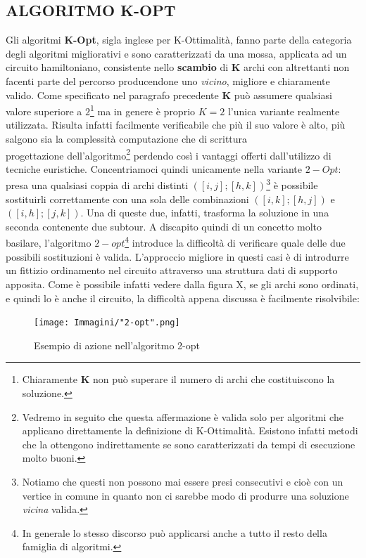 \documentclass[11pt]{article}
\begin{document}
\subsection*{ALGORITMO K-OPT}

Gli algoritmi \textbf{K-Opt}, sigla inglese per K-Ottimalità, fanno parte della categoria degli algoritmi migliorativi e sono caratterizzati da una mossa, applicata ad un circuito hamiltoniano, consistente nello \textbf{scambio} di \textbf{K} archi con altrettanti non facenti parte del percorso producendone uno \textit{vicino}, migliore e chiaramente valido.
Come specificato nel paragrafo precedente \textbf{K} può assumere qualsiasi valore superiore a $2$\footnote{Chiaramente \textbf{K} non può superare il numero di archi che costituiscono la soluzione.} ma in genere è proprio $K = 2$ l'unica variante realmente utilizzata. Risulta infatti facilmente verificabile che più il suo valore è alto, più salgono sia la complessità computazione che di scrittura\\progettazione dell'algoritmo\footnote{Vedremo in seguito che questa affermazione è valida solo per algoritmi che applicano direttamente la definizione di K-Ottimalità. Esistono infatti metodi che la ottengono indirettamente se sono caratterizzati da tempi di esecuzione molto buoni.} perdendo così i vantaggi offerti dall'utilizzo di tecniche euristiche.
Concentriamoci quindi unicamente nella variante $2-Opt$: presa una qualsiasi coppia di archi distinti $([i,j];[h,k])$\footnote{Notiamo che questi non possono mai essere presi consecutivi e cioè con un vertice in comune in quanto non ci sarebbe modo di produrre una soluzione \textit{vicina} valida.} è possibile sostituirli correttamente con una sola delle combinazioni $([i,k];[h,j])$ e $([i,h];[j,k])$. Una di queste due, infatti, trasforma la soluzione in una seconda contenente due subtour.
A discapito quindi di un concetto molto basilare, l'algoritmo $2-opt$\footnote{In generale lo stesso discorso può applicarsi anche a tutto il resto della famiglia di algoritmi.} introduce la difficoltà di verificare quale delle due possibili sostituzioni è valida. L'approccio migliore in questi casi è di introdurre un fittizio ordinamento nel circuito attraverso una struttura dati di supporto apposita. Come è possibile infatti vedere dalla figura X, se gli archi sono ordinati, e quindi lo è anche il circuito, la difficoltà appena discussa è facilmente risolvibile: 

\begin{figure}[htbp]
    \centering
    \texttt{[image: Immagini/"2-opt".png]}
    \caption{Esempio di azione nell'algoritmo 2-opt}
\end{figure}
\end{document}
